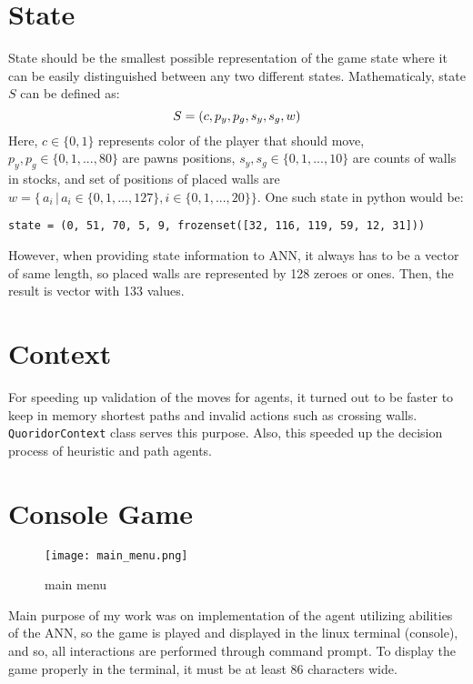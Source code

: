 \section{State}
State should be the smallest possible representation of the game state where
it can be easily distinguished between any two different states. Mathematicaly,
state $S$ can be defined as:
\begin{equation}
  \label{eqn:state_def}
  S = (c, p_y, p_g, s_y, s_g, w)
  \vspace*{-0.20cm}
\end{equation}
Here, $c\in\{0, 1\} $ represents color of the player that should move,
$p_y,p_g\in\{0,1,...,80\}$ are pawns positions,
${s_y},{s_g} \in \{0, 1, ..., 10\}$ are counts of walls in stocks,
and set of positions of placed walls are
${w = \{\,a_i\,|\,a_i \in \{0, 1, ..., 127\}, i \in \{0, 1, ..., 20\} \}}$.
One such state in python would be:
\begin{lstlisting}
state = (0, 51, 70, 5, 9, frozenset([32, 116, 119, 59, 12, 31]))
\end{lstlisting}

However, when providing state information to ANN, it always has to be a vector
of same length, so placed walls are represented by 128 zeroes or ones. Then,
the result is vector with 133 values.

\section{Context}
For speeding up validation of the moves for agents, it turned out to be faster
to keep in memory shortest paths and invalid actions such as crossing walls.
{\lstinline{QuoridorContext}} class serves this purpose.
Also, this speeded up the decision process of heuristic and path agents.

\section{Console Game}
\begin{wrapfigure}{r}{0.5\textwidth}
  \vspace*{-2.05cm}
  \centering
  \texttt{[image: main\_menu.png]}
  \vspace*{-0.35cm}
  \caption{main menu}
  \label{fig:main_menu}
  \vspace*{-0.70cm}
\end{wrapfigure}

Main purpose of my work was on implementation of the agent utilizing abilities
of the ANN, so the game is played and displayed in the linux terminal
(console), and so, all interactions are performed through command prompt.
To display the game properly in the terminal, it must be at least 86 characters
wide.

